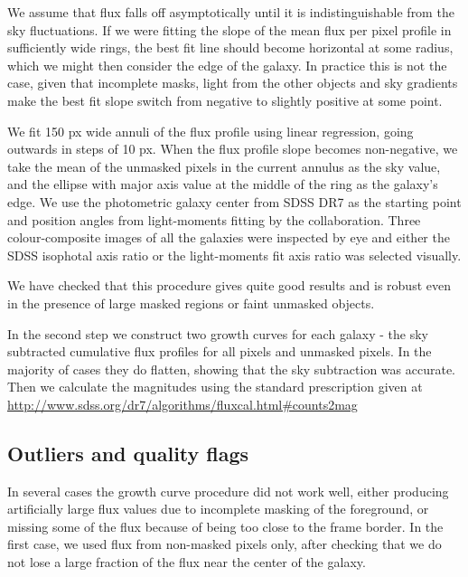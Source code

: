 \documentclass[apj, onecolumn]{emulateapj}
\begin{document}
We assume that flux falls off asymptotically until it is indistinguishable from the sky fluctuations.
If we were fitting the slope of the mean flux per pixel profile in sufficiently wide rings, the best fit line should become horizontal at some radius, which we might then consider the edge of the galaxy. In practice this is not the case, given that incomplete masks, light from the other objects and sky gradients make the best fit slope switch from negative to slightly positive at some point. 

We fit 150 px wide annuli of the flux profile using linear regression, going outwards in steps of 10 px. When the flux profile slope becomes non-negative, we take the mean of the unmasked pixels in the current annulus as the sky value, and the ellipse with major axis value at the middle of the ring as the galaxy's edge. We use the photometric galaxy center from SDSS DR7 as the starting point and position angles from light-moments fitting by the collaboration. Three colour-composite images of all the galaxies were inspected by eye and either the SDSS isophotal axis ratio or the light-moments fit axis ratio was selected visually. 

We have checked that this procedure gives quite good results and is robust even in the presence of large masked regions or faint unmasked objects. %

In the second step we construct two growth curves for each galaxy - the sky subtracted cumulative flux profiles for all pixels and unmasked pixels. In the majority of cases they do flatten, showing that the sky subtraction was accurate. Then we calculate the magnitudes using the standard prescription given at \url{http://www.sdss.org/dr7/algorithms/fluxcal.html#counts2mag}

\subsection{Outliers and quality flags}
In several cases the growth curve procedure did not work well, either producing artificially large flux values due to incomplete masking of the foreground, or missing some of the flux because of being too close to the frame border. In the first case, we used flux from non-masked pixels only, after checking that we do not lose a large fraction of the flux near the center of the galaxy. 
\end{document}
